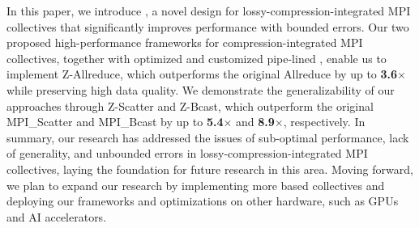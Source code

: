 
In this paper, we introduce {\pname}, a novel design for lossy-compression-integrated MPI collectives that significantly improves performance with bounded errors. Our two proposed high-performance frameworks for compression-integrated MPI collectives, together with optimized and customized pipe-lined {\fzlight}, enable us to implement Z-Allreduce, which outperforms the original Allreduce by up to \textbf{3.6$\times$} while preserving high data quality. We demonstrate the generalizability of our approaches through Z-Scatter and Z-Bcast, which outperform the original MPI\_Scatter and MPI\_Bcast by up to \textbf{5.4$\times$} and \textbf{8.9$\times$}, respectively. In summary, our research has addressed the issues of sub-optimal performance, lack of generality, and unbounded errors in lossy-compression-integrated MPI collectives, laying the foundation for future research in this area. Moving forward, we plan to expand our research by implementing more {\pname} based collectives and deploying our frameworks and optimizations on other hardware, such as GPUs and AI accelerators.